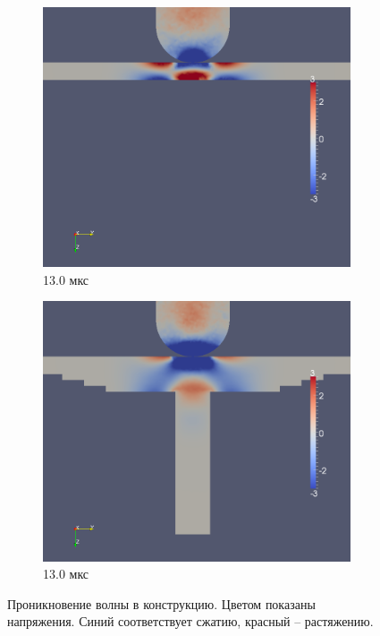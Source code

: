\begin{figure}[H]
\begin{subfigure}[b]{0.5\textwidth}
\centering
\includegraphics[width=\textwidth]{png/pkm-experiment/wing-only/wave/syy-0011.png}
\caption{13.0 мкс}
\end{subfigure}
\begin{subfigure}[b]{0.5\textwidth}
\centering
\includegraphics[width=\textwidth]{png/pkm-experiment/wing-stringer/wave/syy-0011.png}
\caption{13.0 мкс}
\end{subfigure}
\caption{Проникновение волны в конструкцию. Цветом показаны напряжения. Синий соответствует сжатию, красный -- растяжению.}
\label{pic:pkm_experiment_stress_end}
\end{figure}

